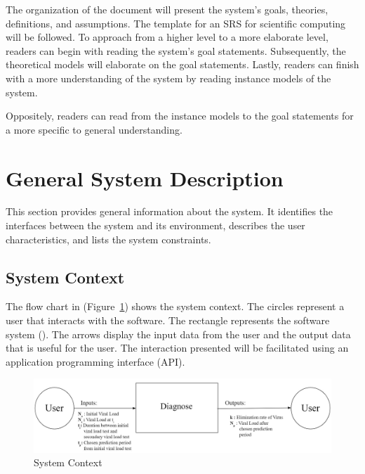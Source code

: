 \documentclass[12pt]{article}
\begin{document}
The organization of the document will present the system's goals, theories, 
definitions, and assumptions. The template for an SRS for scientific computing 
will be followed. To approach \progname{} from a higher level to a more 
elaborate level, readers can begin with reading the system's goal statements. 
Subsequently, the theoretical models will elaborate on the goal statements. 
Lastly, 
readers can finish with a more  understanding of the system by reading instance 
models of the system. 

Oppositely, readers can read from the instance models to the goal statements for 
a more specific to general understanding.




\section{General System Description}

This section provides general information about the system. It identifies 
the interfaces
between the system and its environment, describes the user characteristics, and 
lists the
system constraints.


\subsection{System Context}

The flow chart in (Figure~\ref{Fig_SystemContext}) shows the system 
context. The circles 
represent a user that interacts with the software. The rectangle represents the 
software system (\progname{}). The arrows display the input data from the 
user 
and the output data that is useful for the user. The interaction presented will 
be facilitated using an application programming interface (API).


\begin{figure}[ht]
\begin{center}
 \includegraphics[width=1\textwidth]{systemcontext.jpg}
\caption{System Context}
\label{Fig_SystemContext} 
\end{center}
\end{figure}
\end{document}
